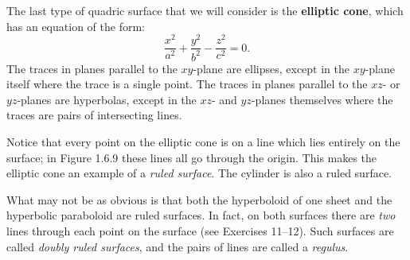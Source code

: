 The last type of quadric surface that we will consider is the \textbf{elliptic cone}, which has
an equation of the form:
\begin{equation}\label{eqn:ellipcone}
 \frac{x^2}{a^2} + \frac{y^2}{b^2} - \frac{z^2}{c^2} = 0.
\end{equation}
The traces in planes parallel to the $xy$-plane are ellipses, except in the $xy$-plane itself where the trace is a
single point. The traces in planes parallel to the $xz$- or $yz$-planes are hyperbolas, except in the $xz$- and
$yz$-planes themselves where the traces are pairs of intersecting lines.

Notice that every point on the elliptic cone is on a line which lies entirely on the surface; in Figure 1.6.9 these
lines all go through the origin. This makes the elliptic
cone an example of a \emph{ruled surface}.
The cylinder is also a ruled surface.

What may not be as obvious is that both the hyperboloid of one sheet and the hyperbolic paraboloid are
ruled surfaces. In fact, on both surfaces there are \emph{two} lines through each point on the surface 
(see Exercises 11--12). 
Such surfaces are called \emph{doubly ruled surfaces},
and the pairs of lines are called a \emph{regulus}.

